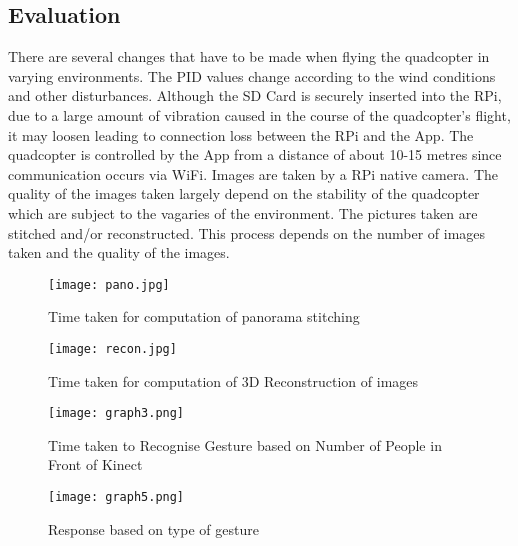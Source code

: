 \subsection{Evaluation}
There are several changes that have to be made when flying the quadcopter in varying environments. The PID values change according to the wind conditions and other disturbances. Although the SD Card is securely inserted into the RPi, due to a large amount of vibration caused in the course of the quadcopter's flight, it may loosen leading to connection loss between the RPi and the App. The quadcopter is controlled by the App from a distance of about 10-15 metres since communication occurs via WiFi. Images are taken by a RPi native camera. The quality of the images taken largely depend on the stability of the quadcopter which are subject to the vagaries of the environment.
The pictures taken are stitched and/or reconstructed. This process depends on the number of images taken and the quality of the images. 
\begin{figure}[H]
  \centering
  \texttt{[image: pano.jpg]}
  \caption{Time taken for computation of panorama stitching}
  \label{panorama stitching time graph}	
\end{figure}


\begin{figure}[H]
  \centering
  \texttt{[image: recon.jpg]}
  \caption{Time taken for computation of 3D Reconstruction of images}
  \label{reconstruction time graph}	
\end{figure}

\begin{figure}[H]
  \centering
  \texttt{[image: graph3.png]}
  \caption{Time taken to Recognise Gesture based on Number of People in Front of Kinect}
  \label{Kinect performance}	
\end{figure}


\begin{figure}[H]
  \centering
  \texttt{[image: graph5.png]}
  \caption{Response based on type of gesture}
  \label{Gesture-action pair}	
\end{figure}


